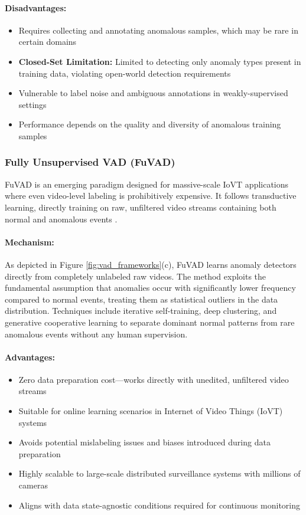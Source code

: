 \documentclass[12pt]{article}
\begin{document}
\paragraph{Disadvantages:}
\begin{itemize}
    \item Requires collecting and annotating anomalous samples, which may be rare in certain domains
    \item \textbf{Closed-Set Limitation:} Limited to detecting only anomaly types present in training data, violating open-world detection requirements
    \item Vulnerable to label noise and ambiguous annotations in weakly-supervised settings
    \item Performance depends on the quality and diversity of anomalous training samples
\end{itemize}

\subsubsection{Fully Unsupervised VAD (FuVAD)}
FuVAD is an emerging paradigm designed for massive-scale IoVT applications where even video-level labeling is prohibitively expensive. It follows transductive learning, directly training on raw, unfiltered video streams containing both normal and anomalous events \citep{liu2024networking}.

\paragraph{Mechanism:} 
As depicted in Figure \ref{fig:vad_frameworks}(c), FuVAD learns anomaly detectors directly from completely unlabeled raw videos. The method exploits the fundamental assumption that anomalies occur with significantly lower frequency compared to normal events, treating them as statistical outliers in the data distribution. Techniques include iterative self-training, deep clustering, and generative cooperative learning to separate dominant normal patterns from rare anomalous events without any human supervision.

\paragraph{Advantages:}
\begin{itemize}
    \item Zero data preparation cost—works directly with unedited, unfiltered video streams
    \item Suitable for online learning scenarios in Internet of Video Things (IoVT) systems
    \item Avoids potential mislabeling issues and biases introduced during data preparation
    \item Highly scalable to large-scale distributed surveillance systems with millions of cameras
    \item Aligns with data state-agnostic conditions required for continuous monitoring
\end{itemize}
\end{document}
